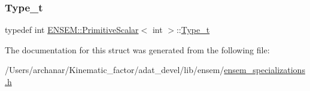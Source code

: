 \subsubsection{\texorpdfstring{Type\_t}{Type\_t}\hspace{0.1cm}{\footnotesize\ttfamily [2/2]}}
{\footnotesize\ttfamily typedef int \mbox{\hyperlink{structENSEM_1_1PrimitiveScalar}{E\+N\+S\+E\+M\+::\+Primitive\+Scalar}}$<$ int $>$\+::\mbox{\hyperlink{structENSEM_1_1PrimitiveScalar_3_01int_01_4_add9ad08e498afda6942432a1df83407b}{Type\+\_\+t}}}



The documentation for this struct was generated from the following file\+:\begin{DoxyCompactItemize}
\item 
/\+Users/archanar/\+Kinematic\+\_\+factor/adat\+\_\+devel/lib/ensem/\mbox{\hyperlink{lib_2ensem_2ensem__specializations_8h}{ensem\+\_\+specializations.\+h}}\end{DoxyCompactItemize}
